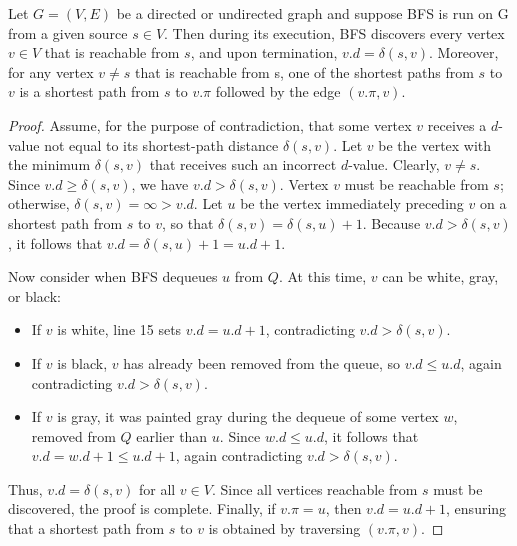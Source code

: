 \newtheorem{correctedness of bfs}{Lemma}
\begin{theorem}
    Let $G = (V, E)$ be a directed or undirected graph and suppose BFS is run on G 
    from a given source $s \in V$. Then during its execution, BFS discovers every vertex
    $v \in V$ that is reachable from $s$, and upon termination, $v.d = \delta(s, v)$.
    Moreover, for any vertex $v \neq s$ that is reachable from s, one of the shortest paths 
    from $s$ to $v$ is a shortest path from $s$ to $v.\pi$ followed by the edge $(v.\pi, v)$.
\end{theorem}
\begin{proof}
    Assume, for the purpose of contradiction, that some vertex $v$ receives a $d$-value not equal to its shortest-path distance $\delta(s, v)$. Let $v$ be the vertex with the minimum $\delta(s, v)$ that receives such an incorrect $d$-value. Clearly, $v \neq s$. Since 
    $v.d \geq \delta(s, v)$, 
    we have 
    $v.d > \delta(s, v)$. 
    Vertex $v$ must be reachable from $s$; otherwise, 
    $\delta(s, v) = \infty > v.d$. 
    Let $u$ be the vertex immediately preceding $v$ on a shortest path from $s$ to $v$, so that 
    $\delta(s, v) = \delta(s, u) + 1$. 
    Because 
    $v.d > \delta(s, v)$, 
    it follows that 
    $v.d = \delta(s, u) + 1 = u.d + 1$. 

    Now consider when BFS dequeues $u$ from $Q$. At this time, $v$ can be white, gray, or black:
    \begin{itemize}
        \item If $v$ is white, line 15 sets 
        $v.d = u.d + 1$, 
        contradicting 
        $v.d > \delta(s, v)$.

        \item If $v$ is black, $v$ has already been removed from the queue, so 
        $v.d \leq u.d$, 
        again contradicting 
        $v.d > \delta(s, v)$.

        \item If $v$ is gray, it was painted gray during the dequeue of some vertex $w$, removed from $Q$ earlier than $u$. Since 
        $w.d \leq u.d$, 
        it follows that 
        $v.d = w.d + 1 \leq u.d + 1$, 
        again contradicting 
        $v.d > \delta(s, v)$.
    \end{itemize}

    Thus, $v.d = \delta(s, v)$ for all $v \in V$. Since all vertices reachable from $s$ must be discovered, the proof is complete. Finally, if $v.\pi = u$, then $v.d = u.d + 1$, ensuring that a shortest path from $s$ to $v$ is obtained by traversing $(v.\pi, v)$.
\end{proof}


